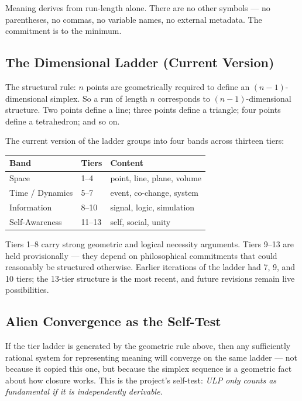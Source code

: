 \documentclass[11pt, letterpaper]{article}
\begin{document}
Meaning derives from run-length alone. There are no other symbols --- no parentheses, no commas, no variable names, no external metadata. The commitment is to the minimum.

\subsection{The Dimensional Ladder (Current Version)}

The structural rule: $n$ points are geometrically required to define an $(n-1)$-dimensional simplex. So a run of length $n$ corresponds to $(n-1)$-dimensional structure. Two points define a line; three points define a triangle; four points define a tetrahedron; and so on.

The current version of the ladder groups into four bands across thirteen tiers:

\begin{center}
\begin{tabular}{@{}lll@{}}
\textbf{Band} & \textbf{Tiers} & \textbf{Content} \\
\hline
Space            & 1--4   & point, line, plane, volume \\
Time / Dynamics  & 5--7   & event, co-change, system \\
Information      & 8--10  & signal, logic, simulation \\
Self-Awareness   & 11--13 & self, social, unity \\
\end{tabular}
\end{center}

Tiers 1--8 carry strong geometric and logical necessity arguments. Tiers 9--13 are held provisionally --- they depend on philosophical commitments that could reasonably be structured otherwise. Earlier iterations of the ladder had 7, 9, and 10 tiers; the 13-tier structure is the most recent, and future revisions remain live possibilities.

\subsection{Alien Convergence as the Self-Test}

If the tier ladder is generated by the geometric rule above, then any sufficiently rational system for representing meaning will converge on the same ladder --- not because it copied this one, but because the simplex sequence is a geometric fact about how closure works. This is the project's self-test: \emph{ULP only counts as fundamental if it is independently derivable}.
\end{document}
